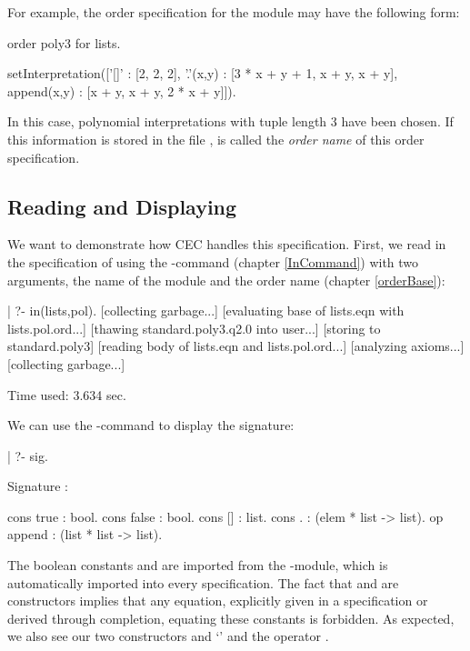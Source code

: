 For example, the order specification for the module 
may have the following form:

\begin{spec}
order poly3 for lists.

setInterpretation(['[]'        : [2, 2, 2],
                   '.'(x,y)    : [3 * x + y + 1, x + y, x + y],
                   append(x,y) : [x + y, x + y, 2 * x + y]]).
\end{spec}

In this case, polynomial interpretations with tuple length 3
have been chosen. If this information is stored in the file ,
 is called the {\em order name} of this order specification.

\subsection{Reading and Displaying}

We want to demonstrate how CEC handles this specification. 
First, we read in the specification of  using
the -command ( chapter \ref{InCommand})
with two arguments, the name of the module and the order name
( chapter \ref{orderBase}):

\begin{screen}
| ?- in(lists,pol).
[collecting garbage...]
[evaluating base of lists.eqn with lists.pol.ord...]
 [thawing standard.poly3.q2.0 into user...]
 [storing to standard.poly3]
[reading body of lists.eqn and lists.pol.ord...]
[analyzing axioms...]
[collecting garbage...]

Time used: 3.634 sec.
\end{screen}

\noindent
We can use the -command to display the signature:

\begin{screen}
| ?- sig.

Signature :

cons true       : bool.
cons false      : bool.
cons []	: list.
cons .  : (elem * list -> list).
op append       : (list * list -> list).
\end{screen}

The boolean constants  and  are imported
from the -module, which is automatically imported into 
every specification. The fact that  and 
are constructors implies that any equation, explicitly given in
a specification or derived through completion, equating these
constants is forbidden.
As expected, we also see our two constructors \cec{[]} and
`' and the operator .

